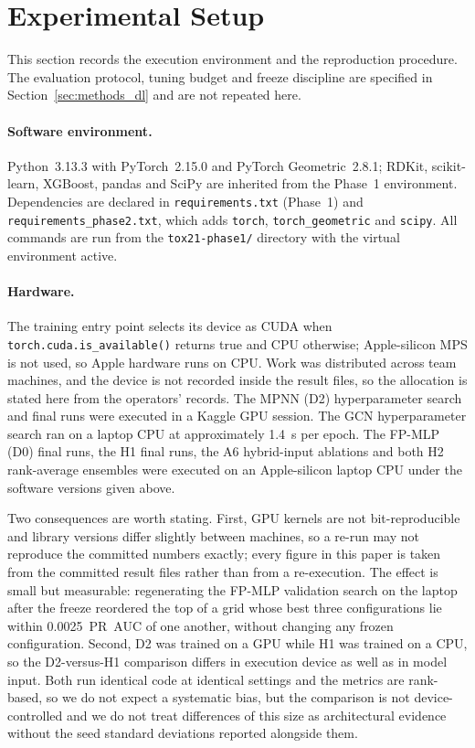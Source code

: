 \section{Experimental Setup}
\label{sec:setup}

This section records the execution environment and the reproduction procedure. The evaluation protocol, tuning budget and freeze discipline are specified in Section~\ref{sec:methods_dl} and are not repeated here.

\paragraph{Software environment.}
Python~3.13.3 with PyTorch~2.15.0 and PyTorch Geometric~2.8.1; RDKit, scikit-learn, XGBoost, pandas and SciPy are inherited from the Phase~1 environment. Dependencies are declared in \texttt{requirements.txt} (Phase~1) and \texttt{requirements\_phase2.txt}, which adds \texttt{torch}, \texttt{torch\_geometric} and \texttt{scipy}. All commands are run from the \texttt{tox21-phase1/} directory with the virtual environment active.

\paragraph{Hardware.}
The training entry point selects its device as CUDA when \texttt{torch.cuda.is\_available()} returns true and CPU otherwise; Apple-silicon MPS is not used, so Apple hardware runs on CPU. Work was distributed across team machines, and the device is not recorded inside the result files, so the allocation is stated here from the operators' records. The MPNN (D2) hyperparameter search and final runs were executed in a Kaggle GPU session. The GCN hyperparameter search ran on a laptop CPU at approximately 1.4~s per epoch. The FP-MLP (D0) final runs, the H1 final runs, the A6 hybrid-input ablations and both H2 rank-average ensembles were executed on an Apple-silicon laptop CPU under the software versions given above.

Two consequences are worth stating. First, GPU kernels are not bit-reproducible and library versions differ slightly between machines, so a re-run may not reproduce the committed numbers exactly; every figure in this paper is taken from the committed result files rather than from a re-execution. The effect is small but measurable: regenerating the FP-MLP validation search on the laptop after the freeze reordered the top of a grid whose best three configurations lie within 0.0025~PR~AUC of one another, without changing any frozen configuration. Second, D2 was trained on a GPU while H1 was trained on a CPU, so the D2-versus-H1 comparison differs in execution device as well as in model input. Both run identical code at identical settings and the metrics are rank-based, so we do not expect a systematic bias, but the comparison is not device-controlled and we do not treat differences of this size as architectural evidence without the seed standard deviations reported alongside them.

